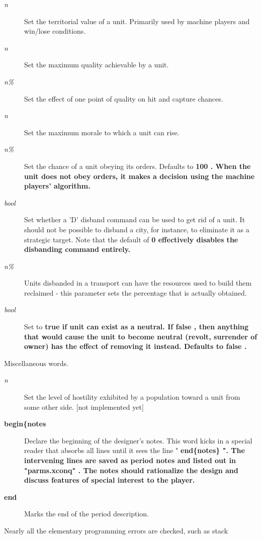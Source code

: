 \begin{description}
\item[{%
\it n}]
Set the territorial value of a unit.  Primarily used by machine players
and win/lose conditions.
\item[{%
\it n}]
Set the maximum quality achievable by a unit.
\item[{%
\it n\%}]
Set the effect of one point of quality on hit and capture chances.
\item[{%
\it n}]
Set the maximum morale to which a unit can rise.
\item[{%
\it n\%}]
Set the chance of a unit obeying its orders.  Defaults to %
\bf 100\rm%
.
When the unit does not obey orders, it makes a decision using the machine
players' algorithm.
\item[{%
\it bool}]
Set whether a 'D' disband command can be used to get rid of a unit.
It should not be possible to disband a city, for instance, to eliminate
it as a strategic target.  Note that the default of %
\bf 0 \rm%
effectively
disables the disbanding command entirely.
\item[{%
\it n\%}]
Units disbanded in a transport can have the resources used to build them
reclaimed - this parameter sets the percentage that is actually obtained.
\item[{%
\it bool}]
Set to %
\bf true \rm%
if unit can exist as a neutral.
If %
\bf false\rm%
, then anything that
would cause the unit to become neutral (revolt, surrender of owner)
has the effect of removing it instead.  Defaults to %
\bf false\rm%
.
\end{description}\par\noindent
Miscellaneous words.
\begin{description}
\item[{%
\it n}]
Set the level of hostility exhibited by a population toward a unit
from some other side. [not implemented yet]
\item[{%
\bf begin\{notes}]
Declare the beginning of the designer's notes.  This word kicks in a
special reader that absorbs all lines until it sees the line
"%
\bf end\{notes\}\rm%
".  The intervening lines are saved as period notes and
listed out in %
\bf "parms.xconq"\rm%
.
The notes should rationalize the design and discuss features
of special interest to the player.
\item[{%
\bf end%
\rm }]
Marks the end of the period description.
\end{description}\par\noindent
Nearly all the elementary programming errors are checked, such as stack
